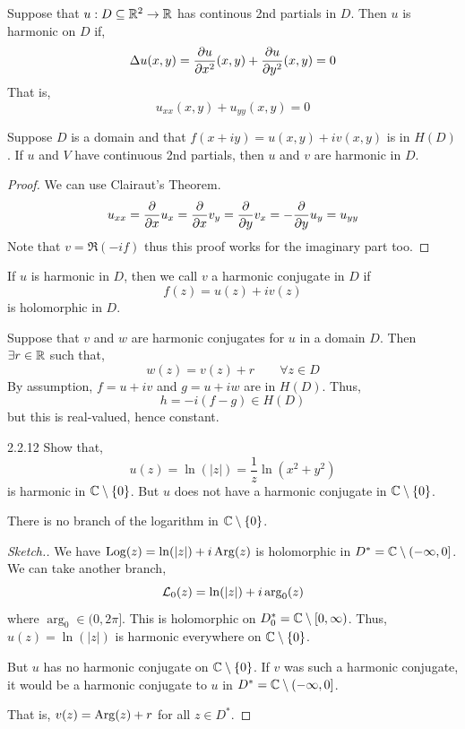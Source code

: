 \documentclass[12pt]{amsart}
\begin{document}
\begin{definition}
    Suppose that $u: D \subseteq \mathbb R^2 \to \mathbb R$ has continous 2nd partials in $D$. Then $u$ is harmonic on $D$ if, 
    \[\Delta u(x,y) = \frac{\partial u}{\partial x^2}(x,y) + \frac{\partial u}{\partial y^2}(x,y)  = 0\]
    That is, 
    \[ u_{xx}(x,y) + u_{yy}(x,y) = 0\]
\end{definition}

\begin{proposition}
    Suppose $D$ is a domain and that $f(x+iy) = u(x,y) + iv(x,y)$ is in $H(D)$. If $u$ and $V$ have continuous 2nd partials, then $u$ and $v$ are harmonic in $D$. 
\end{proposition}

\begin{proof}
    We can use Clairaut's Theorem. 
    \begin{align*}
        u_{xx} = \frac{\partial}{\partial x} u_x = \frac{\partial}{\partial x} v_y = \frac{\partial}{\partial y} v_x = -\frac{\partial}{\partial y} u_y = u_{yy}
    \end{align*}
    Note that $v = \Re(-if)$ thus this proof works for the imaginary part too. 
\end{proof}

\begin{definition}
    If $u$ is harmonic in $D$, then we call $v$ a harmonic conjugate in $D$ if 
    \[ f(z) = u(z) + iv(z)\]
    is holomorphic in $D$. 
\end{definition}

\begin{lemma}
    Suppose that $v$ and $w$ are harmonic conjugates for $u$ in a domain $D$. Then $\exists r \in \mathbb R$ such that, 
    \[ w(z) = v(z) + r \qquad \forall z \in D\] 
    By assumption, $f = u+iv$ and $g = u+iw$ are in $H(D)$. Thus, 
    \[ h = -i(f-g) \in H(D)\]
    but this is real-valued, hence constant. 
\end{lemma}

\begin{exercise}{2.2.12}
    Show that, 
    \[ u(z) = \ln(|z|) = \frac{1}{z} \ln(x^2+y^2)\]
    is harmonic in $\mathbb C \setminus \{0\}$. But $u$ does not have a harmonic conjugate in $\mathbb C \setminus \{0\}$. 
\end{exercise}
\begin{corollary}
    There is no branch of the logarithm in $\mathbb C \setminus \{0\}$. 
\end{corollary}
\begin{proof}[Sketch.]
    We have $\operatorname{Log}(z) = \ln(|z|) + i \operatorname{Arg}(z)$ is holomorphic in $D^* = \mathbb C \setminus (-\infty, 0]$. We can take another branch, 
    \[ \mathcal{L}_0(z) = \ln(|z|) + i\arg_0(z)\]
    where $\arg_0 \in (0, 2\pi]$. This is holomorphic on $D_0^* = \mathbb C \setminus [0, \infty)$. Thus, $u(z) = \ln(|z|)$ is harmonic everywhere on $\mathbb C \setminus \{0\}$. 

    But $u$ has no harmonic conjugate on $\mathbb C \setminus \{0\}$. If $v$ was such a harmonic conjugate, it would be a harmonic conjugate to $u$ in $D^* = \mathbb C \setminus (-\infty, 0]$. 

    That is, $v(z) = \operatorname{Arg}(z) + r$ for all $z \in D^*$. 
\end{proof}
\end{document}
